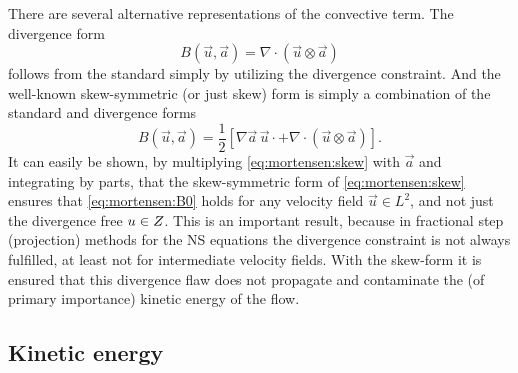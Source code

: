 There are several alternative representations of the convective
term. The divergence form
\begin{equation}
B(\vec{u},\vec{a})=\nabla \cdot (\vec{u} \otimes \vec{a})
\end{equation}
follows from the standard simply by utilizing the divergence
constraint. And the well-known skew-symmetric (or just skew) form is
simply a combination of the standard and divergence forms
\begin{equation}
 B(\vec{u},\vec{a}) = \frac{1}{2}\left[ \nabla \vec{a} \, \vec{u}\cdot  + \nabla \cdot (\vec{u} \otimes \vec{a}) \right].
\label{eq:mortensen:skew}
\end{equation}
It can easily be shown, by multiplying \eqref{eq:mortensen:skew} with
$\vec{a}$ and integrating by parts, that the skew-symmetric form of
\eqref{eq:mortensen:skew} ensures that \eqref{eq:mortensen:B0} holds
for any velocity field $\vec{u} \in L^2$, and not just the divergence
free ${u} \in Z$. This is an important result, because in
fractional step (projection) methods for the NS equations the divergence
constraint is not always fulfilled, at least not for intermediate velocity
fields. With the skew-form it is ensured that this divergence flaw does
not propagate and contaminate the (of primary importance) kinetic energy
of the flow.

\subsection{Kinetic energy}
\label{sec:mortensen:kinetic}

